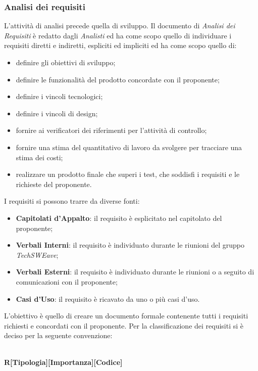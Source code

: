 \subsubsection{Analisi dei requisiti}
L’attività di analisi precede quella di sviluppo. Il documento di \textit{Analisi dei Requisiti} è redatto dagli \textit{Analisti} ed ha come scopo quello di individuare i requisiti diretti e indiretti, espliciti ed impliciti ed ha come scopo quello di:
\begin{itemize}
    \item definire gli obiettivi di sviluppo;
    \item definire le funzionalità del prodotto concordate con il proponente;
    \item definire i vincoli tecnologici;
    \item definire i vincoli di design; 
    \item fornire ai verificatori dei riferimenti per l’attività di controllo;
    \item fornire una stima del quantitativo di lavoro da svolgere per tracciare una stima dei costi;
    \item realizzare un prodotto finale che superi i test, che soddisfi i requisiti e le richieste del proponente.
\end{itemize}
I requisiti si possono trarre da diverse fonti:
\begin{itemize}
    \item \textbf{Capitolati d'Appalto}: il requisito è esplicitato nel capitolato del proponente;
    \item \textbf{Verbali Interni}: il requisito è individuato durante le riunioni del gruppo \textit{TechSWEave};
    \item \textbf{Verbali Esterni}: il requisito è individuato durante le riunioni o a seguito di comunicazioni con il proponente;
    \item \textbf{Casi d'Uso}: il requisito è ricavato da uno o più casi d’uso.
\end{itemize}
L’obiettivo è quello di creare un documento formale contenente tutti i requisiti richiesti e concordati con il proponente. 
Per la classificazione dei requisiti si è deciso per la seguente convenzione:\\
\\\centerline{\textbf{R[Tipologia][Importanza][Codice]}}\newline\newline
